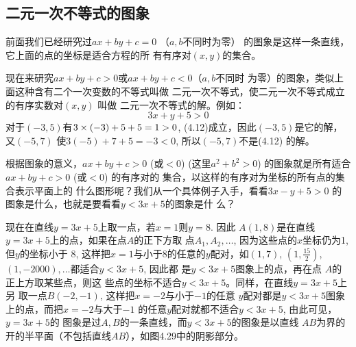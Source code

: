\subsection{二元一次不等式的图象}
前面我们已经研究过$ax+by+c=0$ （$a,b$不同时为零）
的图象是这样一条直线，它上面的点的坐标是适合方程的所
有有序对$(x,y)$的集合。

现在来研究$ax+by+c>0$或$ax+by+c<0$（$a,b$不同时
为零）的图象，类似上面这种含有二个一次变数的不等式叫做
二元一次不等式，使二元一次不等式成立的有序实数对$(x,y)$
叫做 二元一次不等式的解。例如：
\begin{equation}
 3x+y+5>0   
\end{equation}
对于$(-3,5)$有$3\times(-3)+5+5=
1>0$, (4.12)成立，因此$(-3,5)$是它的解，又$(-5,7)$
使$3(-5)+7+5=-3<0$, 所以$(-5,7)$不是(4.12)
的解。

根据图象的意义，$ax+by+c>0$ (或$<0$) (这里$a^2+b^2>
0$) 的图象就是所有适合$ax+by+c>0$ (或$<0$) 的有序对的
集合，以这样的有序对为坐标的所有点的集合表示平面上的
什么图形呢？我们从一个具体例子入手，看看$3x-y+5>0$
的图象是什么，也就是要看看$y<3x+5$的图象是什
么？

现在在直线$y=3x+5$上取一点，若$x=1$则$y=8$. 因此
$A(1,8)$是在直线$y=3x+5$上的点，如果在点$A$的正下方取
点$A_1,A_2,\ldots$, 因为这些点的$x$坐标仍为1, 但$y$的坐标小于
8, 这样把$x=1$与小于8的任意的$y$配对，如$(1,7)$, 
$\left(1,\frac{15}{2}\right)$, $(1,-2000),\ldots$都适合$y<3x+5$, 因此都
是$y<3x+5$图象上的点，再在点
$A$的正上方取某些点，则这
些点的坐标不适合$y<3x+5$。同样，在直线$y=3x+5$上另
取一点$B(-2,-1)$, 这样把$x=-2$与小于$-1$的任意
$y$配对都是$y<3x+5$图象上的点，而把$x=-2$与大于$-1$
的任意$y$配对就都不适合$y<3x+5$, 由此可见，$y=3x+5$的
图象是过$A,B$的一条直线，而$y<3x+5$的图象是以直线
$AB$为界的开的半平面（不包括直线$AB$），如图4.29中的阴影部分。

\begin{figure}[htp]
    \centering
{}
    \caption{}
\end{figure}

